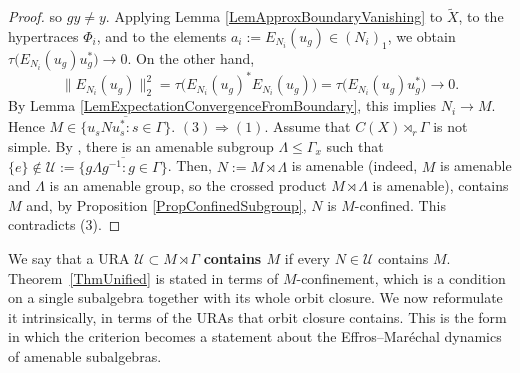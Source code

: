 \documentclass[12pt]{amsart} %
\theoremstyle{plain}
\theoremstyle{definition}
\newcommand{\Ucal}{\mathcal{U}}
\begin{document}
\begin{proof}
so $gy\neq y$. Applying
Lemma \ref{LemApproxBoundaryVanishing} to \(\widetilde{X}\), to the hypertraces \(\Phi_i\), and to the elements $a_i:=E_{N_i}(u_g)\in (N_i)_1$, we obtain $\tau\bigl(E_{N_i}(u_g)u_g^*\bigr)\to 0$. On the other hand,
$$\|E_{N_i}(u_g)\|_2^2=\tau\bigl(E_{N_i}(u_g)^*E_{N_i}(u_g)\bigr)=\tau\bigl(E_{N_i}(u_g)u_g^*\bigr)\to 0.$$
By Lemma \ref{LemExpectationConvergenceFromBoundary}, this implies $N_i\to M$. Hence $M\in \overline{\{u_sNu_s^*:s\in\Gamma\}}$.
\medskip
\noindent $(3)\Rightarrow(1)$. Assume that \(C(X)\rtimes_{ r}\Gamma\) is not simple. By \cite[Theorem 1.7 (iii)]{kawabe2017uniformly}, there is an amenable subgroup \(\Lambda\leq \Gamma_x\) such that $\{e\}\notin\Ucal:=\overline{\{g \Lambda g^{-1}:g\in\Gamma\}}$. Then, $N:=M\rtimes\Lambda$ is amenable (indeed, $M$ is amenable and $\Lambda$ is an amenable group, so the crossed product $M\rtimes\Lambda$ is amenable), contains $M$ and, by
Proposition \ref{PropConfinedSubgroup}, \(N\) is \(M\)-confined. This contradicts (3).\end{proof}
\noindent We say that a URA $\mathcal{U}\subset M\rtimes \Gamma$ \textbf{contains $M$} if every $N\in \mathcal{U}$ contains $M$.
\medskip
\noindent Theorem~\ref{ThmUnified} is stated in terms of $M$-confinement, which
is a condition on a single subalgebra together with its whole orbit closure. We
now reformulate it intrinsically, in terms of the URAs that orbit closure
contains. This is the form in which the criterion becomes a statement about the
Effros--Mar\'echal dynamics of amenable subalgebras.
\end{document}
